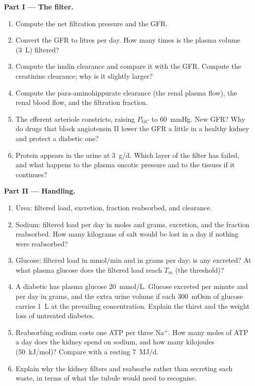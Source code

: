 \begin{problem}
\medskip
\noindent\textbf{Part I --- The filter.}
\begin{enumerate}
  \item Compute the net filtration pressure and the GFR.
  \item Convert the GFR to litres per day. How many times is the plasma
        volume (\qty{3}{L}) filtered?
  \item Compute the inulin clearance and compare it with the GFR.
        Compute the creatinine clearance; why is it slightly larger?
  \item Compute the para-aminohippurate clearance (the renal plasma
        flow), the renal blood flow, and the filtration fraction.
  \item The efferent arteriole constricts, raising $P_{\text{GC}}$ to
        \qty{60}{mmHg}. New GFR? Why do drugs that block angiotensin II
        lower the GFR a little in a healthy kidney and protect a
        diabetic one?
  \item Protein appears in the urine at \qty{3}{g/d}. Which layer of
        the filter has failed, and what happens to the plasma oncotic
        pressure and to the tissues if it continues?
\end{enumerate}

\medskip
\noindent\textbf{Part II --- Handling.}
\begin{enumerate}[resume]
  \item Urea: filtered load, excretion, fraction reabsorbed, and
        clearance.
  \item Sodium: filtered load per day in moles and grams, excretion,
        and the fraction reabsorbed. How many kilograms of salt would
        be lost in a day if nothing were reabsorbed?
  \item Glucose: filtered load in mmol/min and in grams per day; is any
        excreted? At what plasma glucose does the filtered load reach
        $T_{m}$ (the threshold)?
  \item A diabetic has plasma glucose \qty{20}{mmol/L}. Glucose excreted
        per minute and per day in grams, and the extra urine volume if
        each \qty{300}{mOsm} of glucose carries \qty{1}{L} at the
        prevailing concentration. Explain the thirst and the weight
        loss of untreated diabetes.
  \item Reabsorbing sodium costs one ATP per three Na$^{+}$. How many
        moles of ATP a day does the kidney spend on sodium, and how
        many kilojoules (\qty{50}{kJ/mol})? Compare with a resting
        \qty{7}{MJ/d}.
  \item Explain why the kidney filters and reabsorbs rather than
        secreting each waste, in terms of what the tubule would need to
        recognise.
\end{enumerate}


\end{problem}
